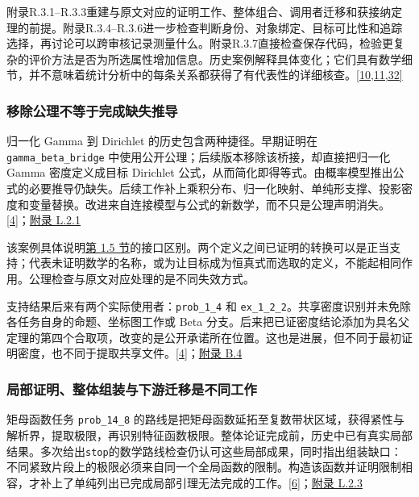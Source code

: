 附录R.3.1–R.3.3重建与原文对应的证明工作、整体组合、调用者迁移和获接纳定理的前提。附录R.3.4–R.3.6进一步检查判断身份、对象绑定、目标可比性和追踪选择，再讨论可以跨审核记录测量什么。附录R.3.7直接检查保存代码，检验更复杂的评价方法是否为所选属性增加信息。历史案例解释具体变化；它们具有数学细节，并不意味着统计分析中的每条关系都获得了有代表性的详细核查。\href{zh.pdf\#ref-10}{\mbox{[10,11,32]}}

\subsubsection[移除公理不等于完成缺失推导]{\texorpdfstring{\protect\hypertarget{r3-1}{}移除公理不等于完成缺失推导}{移除公理不等于完成缺失推导}}
归一化 Gamma 到 Dirichlet 的历史包含两种捷径。早期证明在 \nolinkurl{gamma_beta_bridge} 中使用公开公理；后续版本移除该桥接，却直接把归一化 Gamma 密度定义成目标 Dirichlet 公式，从而简化即得等式。由概率模型推出公式的必要推导仍缺失。后续工作补上乘积分布、归一化映射、单纯形支撑、投影密度和变量替换。改进来自连接模型与公式的新数学，而不只是公理声明消失。\href{zh.pdf\#ref-4}{\mbox{[4]}}；\href{zh-appendix.pdf\#l2-1}{附录 L.2.1}

该案例具体说明\href{zh.pdf\#section-1-5}{第 1.5 节}的接口区别。两个定义之间已证明的转换可以是正当支持；代表未证明数学的名称，或为让目标成为恒真式而选取的定义，不能起相同作用。公理检查与原文对应处理的是不同失效方式。

支持结果后来有两个实际使用者：\nolinkurl{prob_1_4} 和 \nolinkurl{ex_1_2_2}。共享密度识别并未免除各任务自身的命题、坐标图工作或 Beta 分支。后来把已证密度结论添加为具名父定理的第四个合取项，改变的是公开承诺所在位置。这也是进展，但不同于最初证明密度，也不同于提取共享文件。\href{zh.pdf\#ref-4}{\mbox{[4]}}；\href{zh-appendix.pdf\#b4}{附录 B.4}

\subsubsection[局部证明、整体组装与下游迁移是不同工作]{\texorpdfstring{\protect\hypertarget{r3-2}{}局部证明、整体组装与下游迁移是不同工作}{局部证明、整体组装与下游迁移是不同工作}}
矩母函数任务 \nolinkurl{prob_14_8} 的路线是把矩母函数延拓至复数带状区域，获得紧性与解析界，提取极限，再识别特征函数极限。整体论证完成前，历史中已有真实局部结果。多次给出\nolinkurl{stop}的数学路线检查仍认可这些局部成果，同时指出组装缺口：不同紧致片段上的极限必须来自同一个全局函数的限制。构造该函数并证明限制相容，才补上了单纯列出已完成局部引理无法完成的工作。\href{zh.pdf\#ref-6}{\mbox{[6]}}；\href{zh-appendix.pdf\#l2-3}{附录 L.2.3}

